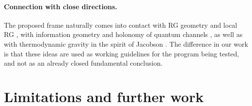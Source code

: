 \documentclass[11pt,a4paper]{article}
\theoremstyle{definition}
\theoremstyle{plain}
\theoremstyle{remark}
\begin{document}
\paragraph{Connection with close directions.}
The proposed frame naturally comes into contact with RG geometry and local RG
\cite{Zamolodchikov1986Irreversibility,Osborn1991LocalRG,CotlerRezchikov2023RGOptimalTransport},
with information geometry and holonomy of quantum channels
\cite{Amari2016InformationGeometry,Uhlmann1986QuantumHolonomy,KultAbergSjoqvist2008HolonomyChannels},
as well as with thermodynamic gravity in the spirit of Jacobson
\cite{Jacobson1995EinsteinEOS,ElingGuedensJacobson2009NonEq}.
The difference in our work is that these ideas are used as working guidelines for the program being tested,
and not as an already closed fundamental conclusion.

\section{Limitations and further work}
\label{sec:limitations}
\end{document}
